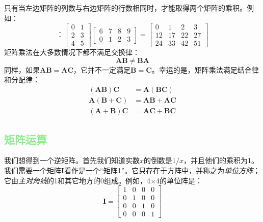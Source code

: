 \documentclass[lang=cn,12pt,marginpar=margintrue]{elegantbook}
\begin{document}
只有当左边矩阵的列数与右边矩阵的行数相同时，才能取得两个矩阵的乘积。例如：
\[：\left[\begin{array}{ll}
      0 & 1 \\
      2 & 3 \\
      4 & 5
    \end{array}\right]\left[\begin{array}{llll}
      6 & 7 & 8 & 9 \\
      0 & 1 & 2 & 3
    \end{array}\right]=\left[\begin{array}{rrrr}
      0  & 1  & 2  & 3  \\
      12 & 17 & 22 & 27 \\
      24 & 33 & 42 & 51
    \end{array}\right]
\]
矩阵乘法在大多数情况下都不满足交换律：
\begin{equation}
  \mathbf{AB} \neq \mathbf{BA}
\end{equation}
同样，如果$\mathbf{AB} = \mathbf{AC}$，它并不一定满足$\mathbf{B} = \mathbf{C}$。幸运的是，矩阵乘法满足结合律和分配律：
\[
  \begin{aligned}
    (\mathbf{A B}) \mathbf{C}          & =\mathbf{A}(\mathbf{B C})  \\
    \mathbf{A}(\mathbf{B}+\mathbf{C})  & =\mathbf{A B}+\mathbf{A C} \\
    (\mathbf{A}+\mathbf{B}) \mathbf{C} & =\mathbf{A C}+\mathbf{B C}
  \end{aligned}
\]

\subsection{\textcolor{lightgreen}{矩阵运算}}

我们想得到一个逆矩阵。首先我们知道实数$x$的倒数是$1/x$，并且他们的乘积为1。我们需要一个矩阵$\mathbf{I}$看作是一个“矩阵1”。它只存在于方阵中，并称之为\textit{单位方阵}；它由\textit{主对角线}的1和其它地方的0组成。例如，4×4的单位阵是：
\[
  \mathbf{I}=\left[\begin{array}{llll}
      1 & 0 & 0 & 0 \\
      0 & 1 & 0 & 0 \\
      0 & 0 & 1 & 0 \\
      0 & 0 & 0 & 1
    \end{array}\right]
\]
\end{document}
